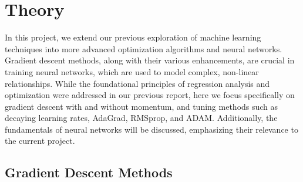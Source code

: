 \documentclass[aps,pra,english,notitlepage,reprint,nofootinbib]{revtex4-1}  %
\begin{document}

\section{Theory}\label{sec:theory}

In this project, we extend our previous exploration of machine learning techniques into more advanced optimization algorithms and neural networks. Gradient descent methods, along with their various enhancements, are crucial in training neural networks, which are used to model complex, non-linear relationships. While the foundational principles of regression analysis and optimization were addressed in our previous report, here we focus specifically on gradient descent with and without momentum, and tuning methods such as decaying learning rates, AdaGrad, RMSprop, and ADAM. Additionally, the fundamentals of neural networks will be discussed, emphasizing their relevance to the current project.

\subsection{Gradient Descent Methods}
\end{document}
